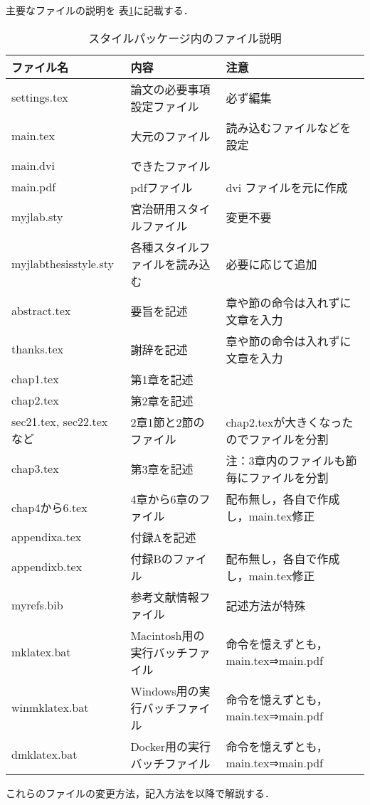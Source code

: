 主要なファイルの説明を 表\ref{table:files2}に記載する．
\begin{table}[H]
\centering
\caption{スタイルパッケージ内のファイル説明}
\vspace{-2mm}
{\footnotesize
\begin{tabular}{|l|l|l|}
\hline
ファイル名 & 内容 & 注意\\\hline\hline
settings.tex & 論文の必要事項設定ファイル & 必ず編集\\\hline
main.tex & 大元のファイル & 読み込むファイルなどを設定\\\hline
main.dvi & できたファイル & \\\hline
main.pdf & pdfファイル & dvi ファイルを元に作成\\\hline
myjlab.sty & 宮治研用スタイルファイル & 変更不要\\\hline
myjlabthesisstyle.sty & 各種スタイルファイルを読み込む & 必要に応じて追加\\\hline
abstract.tex & 要旨を記述 & 章や節の命令は入れずに文章を入力\\\hline
thanks.tex & 謝辞を記述 & 章や節の命令は入れずに文章を入力\\\hline
chap1.tex & 第1章を記述 & \\\hline
chap2.tex & 第2章を記述 & \\\hline
sec21.tex, sec22.tex など& 2章1節と2節のファイル & chap2.texが大きくなったのでファイルを分割\\\hline
chap3.tex & 第3章を記述 & 注：3章内のファイルも節毎にファイルを分割\\\hline
chap4から6.tex & 4章から6章のファイル & 配布無し，各自で作成し，main.tex修正\\\hline
appendixa.tex & 付録Aを記述 & \\\hline
appendixb.tex & 付録Bのファイル & 配布無し，各自で作成し，main.tex修正\\\hline
myrefs.bib & 参考文献情報ファイル & 記述方法が特殊\\\hline
mklatex.bat & Macintosh用の実行バッチファイル & 命令を憶えずとも，main.tex⇒main.pdf\\\hline
winmklatex.bat & Windows用の実行バッチファイル & 命令を憶えずとも，
main.tex⇒main.pdf\\\hline
dmklatex.bat & Docker用の実行バッチファイル & 命令を憶えずとも，
main.tex⇒main.pdf\\\hline
\end{tabular}
}
\label{table:files2}
\end{table}

これらのファイルの変更方法，記入方法を以降で解説する．